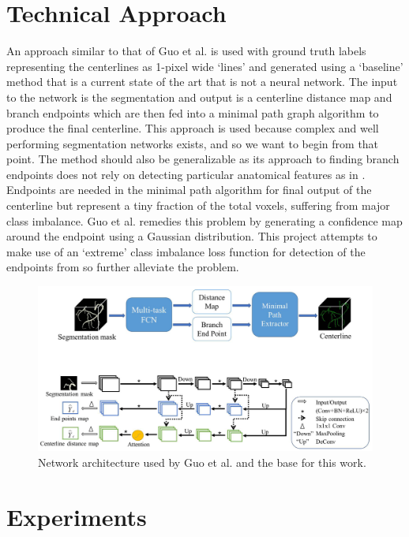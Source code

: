 \documentclass[10pt,twocolumn,letterpaper]{article}
\begin{document}
\section{Technical Approach}

An approach similar to that of Guo et al. \cite{guoDeepCenterlineMultitaskFully2019} is used with ground truth labels representing the centerlines as 1-pixel wide `lines' and generated using a `baseline' method that is a current state of the art that is not a neural network. The input to the network is the segmentation and output is a centerline distance map and branch endpoints which are then fed into a minimal path graph algorithm to produce the final centerline. This approach is used because complex and well performing segmentation networks exists, and so we want to begin from that point. The method should also be generalizable as its approach to finding branch endpoints does not rely on detecting particular anatomical features as in \cite{mostafaImprovedCenterlineExtraction2021}. Endpoints are needed in the minimal path algorithm for final output of the centerline but represent a tiny fraction of the total voxels, suffering from major class imbalance. Guo et al. remedies this problem by generating a confidence map around the endpoint using a Gaussian distribution. This project attempts to make use of an `extreme' class imbalance loss function for detection of the endpoints from \cite{tettehDeepVesselNetVesselSegmentation2020} so further alleviate the problem.

\begin{figure}[t]
\begin{center}
   \includegraphics[width=0.8\linewidth]{network-arch-guo.png}
\end{center}
   \caption{Network architecture used by Guo et al. \cite{guoDeepCenterlineMultitaskFully2019} and the base for this work.}
\label{fig:fig1}
\end{figure}

\section{Experiments}
\end{document}
